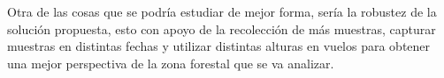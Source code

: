 Otra de las cosas que se podría estudiar de mejor forma, sería la robustez de la solución propuesta, esto con apoyo de la recolección de más muestras, capturar muestras en distintas fechas y  utilizar distintas alturas en vuelos para obtener una mejor perspectiva de la zona forestal que se va analizar.
%
%
